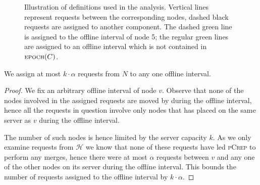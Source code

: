 \documentclass[a4paper,UKenglish,cleveref, autoref, thm-restate,authorcolumns]{lipics-v2019}
\newcommand{\adjDel}{\textsc{pCrep}}
\newcommand{\opt}{\text{O{\scriptsize PT}}}
\newcommand{\epoch}{\text{\scriptsize EPOCH}}
\begin{document}
\begin{center}
\begin{figure}[t]
		\centering
		\caption{Illustration of definitions used in the analysis. Vertical lines 
		represent requests between the corresponding nodes, dashed black requests 
		are assigned to another component. The dashed green line is assigned to 
		the offline interval of node 5; the regular green lines are assigned to 
		an offline interval which is not contained in $\epoch(C)$.}\label{analysis_def_illustration}
	\end{figure}
\end{center}

\begin{lemma}
	\label{offl_int_lemma}
	We assign at most $k\cdot\alpha$ requests from $N$ to any one offline interval.
\end{lemma}

\begin{proof}
	We fix an arbitrary offline interval of node $v$. Observe that none of the nodes involved in the assigned requests are moved by \opt{} during the offline interval, hence all the requests in question involve only nodes that \opt{} has placed on the same server as $v$ during the offline interval. 
	
	The number of such nodes is hence limited by the server capacity $k$. As we only examine requests from $\mathcal{H}$ we know that none of these requests have led \adjDel{} to perform any merges, hence there were at most $\alpha$ requests between $v$ and any one of the other nodes on its server during the offline interval. This bounds the number of requests assigned to the offline interval by $k\cdot\alpha$.
\end{proof}
\end{document}
